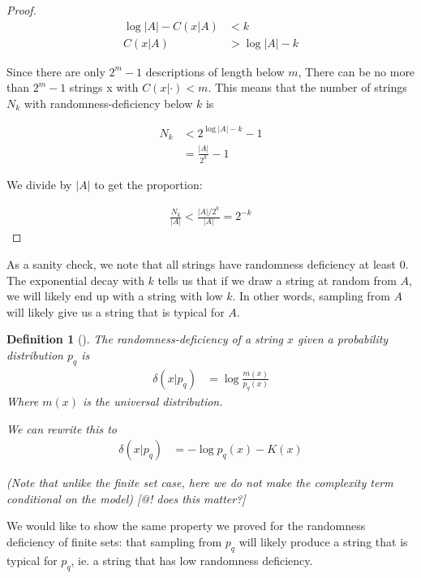 \documentclass[10pt,a4paper,oneside]{article}
\newtheorem{dfn}{Definition}
\begin{document}
\begin{proof}
\begin{align*}
\log |A| - C(x|A) &< k \\
C(x|A) &> \log |A| - k 
\end{align*}

Since there are only $2^m-1$ descriptions of length below $m$, There can be no more than $2^m-1$ strings x with $C(x|\cdot) < m$. This means that the number of strings $N_k$ with randomness-deficiency below $k$ is

\begin{align*}
N_k &< 2^{\log |A| - k}-1 \\
&= \frac{|A|}{2^k} - 1
\end{align*}

We divide by $|A|$ to get the proportion: 

\begin{align*}
\frac{N_k}{|A|} < \frac{|A|/2^k}{|A|} =  2^{-k}
\end{align*}
\end{proof}

As a sanity check, we note that all strings have randomness deficiency at least $0$. The exponential decay with $k$ tells us that if we draw a string at random from $A$, we will likely end up with a string with low $k$. In other words, sampling from $A$ will likely give us a string that is typical for $A$.

\begin{dfn}[{\cite{antunes2009depth}}]
The randomness-deficiency of a string $x$ given a probability distribution $p_q$ is 
\begin{align*}
\delta(x|p_q) &= \log \frac{m(x)}{p_q(x)}
\end{align*} 
Where $m(x)$ is the universal distribution.

We can rewrite this to 
\begin{align*}
\delta(x|p_q) &= - \log p_q(x) - K(x) 
\end{align*}

(Note that unlike the finite set case, here we do not make the complexity term conditional on the model) [@! does this matter?]

\end{dfn}

We would like to show the same property we proved for the randomness deficiency of finite sets: that sampling from $p_q$ will likely produce a string that is typical for $p_q$, ie. a string that has low randomness deficiency.
\end{document}

